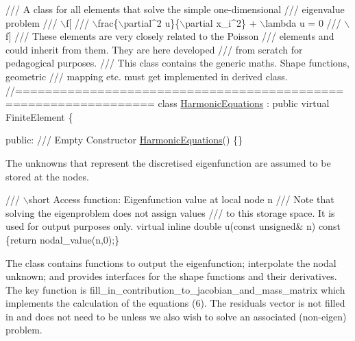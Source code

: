  
\begin{DoxyCodeInclude}
\textcolor{comment}{/// A class for all elements that solve the simple one-dimensional}
\textcolor{comment}{/// eigenvalue problem}
\textcolor{comment}{}\textcolor{comment}{/// \(\backslash\)f[ }
\textcolor{comment}{}\textcolor{comment}{/// \(\backslash\)frac\{\(\backslash\)partial^2 u\}\{\(\backslash\)partial x\_i^2\}  + \(\backslash\)lambda u = 0}
\textcolor{comment}{}\textcolor{comment}{/// \(\backslash\)f] }
\textcolor{comment}{}\textcolor{comment}{/// These elements are very closely related to the Poisson}
\textcolor{comment}{}\textcolor{comment}{/// elements and could inherit from them. They are here developed}
\textcolor{comment}{}\textcolor{comment}{/// from scratch for pedagogical purposes.}
\textcolor{comment}{}\textcolor{comment}{/// This class  contains the generic maths. Shape functions, geometric}
\textcolor{comment}{}\textcolor{comment}{/// mapping etc. must get implemented in derived class.}
\textcolor{comment}{}\textcolor{comment}{//================================================================}
\textcolor{keyword}{class }\hyperlink{classHarmonicEquations}{HarmonicEquations} : \textcolor{keyword}{public} \textcolor{keyword}{virtual} FiniteElement
\{

\textcolor{keyword}{public}:\textcolor{comment}{}
\textcolor{comment}{ /// Empty Constructor}
\textcolor{comment}{} \hyperlink{classHarmonicEquations_a288d1c0777b2cf5360e1310d48f8c217}{HarmonicEquations}() \{\}

\end{DoxyCodeInclude}


The unknowns that represent the discretised eigenfunction are assumed to be stored at the nodes.


\begin{DoxyCodeInclude}
 \textcolor{comment}{}
\textcolor{comment}{ /// \(\backslash\)short Access function: Eigenfunction value at local node n}
\textcolor{comment}{ /// Note that solving the eigenproblem does not assign values}
\textcolor{comment}{ /// to this storage space. It is used for output purposes only.}
\textcolor{comment}{} \textcolor{keyword}{virtual} \textcolor{keyword}{inline} \textcolor{keywordtype}{double} u(\textcolor{keyword}{const} \textcolor{keywordtype}{unsigned}& n)\textcolor{keyword}{ const }
\textcolor{keyword}{  }\{\textcolor{keywordflow}{return} nodal\_value(n,0);\}

\end{DoxyCodeInclude}


The class contains functions to output the eigenfunction; interpolate the nodal unknown; and provides interfaces for the shape functions and their derivatives. The key function is {\ttfamily fill\+\_\+in\+\_\+contribution\+\_\+to\+\_\+jacobian\+\_\+and\+\_\+mass\+\_\+matrix} which implements the calculation of the equations (6). The residuals vector is not filled in and does not need to be unless we also wish to solve an associated (non-\/eigen) problem.


